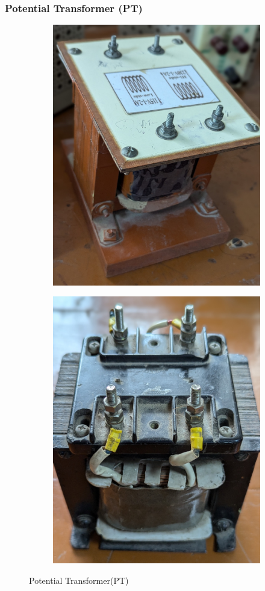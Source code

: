 \documentclass[a4paper,12pt]{article}
\begin{document}
	
	\subsubsection{Potential Transformer (PT)}
			\begin{figure}[H]
		\centering
		\begin{subfigure}[t]{0.49\textwidth}
			\centering
			\includegraphics[width=0.7\linewidth]{Images/22}
			\caption{}
		\end{subfigure}
		\hfill
		\begin{subfigure}[t]{0.49\textwidth}
			\centering
			\includegraphics[width=0.7\linewidth]{Images/24}
			\caption{}
		\end{subfigure}
		
		\caption{Potential Transformer(PT) }
		\label{fig:5}
	\end{figure}
\end{document}
